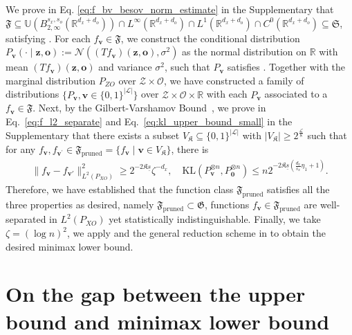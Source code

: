 \documentclass[11pt]{article}
\newcommand{\bz}{\mathbf z}
\newcommand{\bv}{\mathbf v}
\newcommand{\bo}{\mathbf o}
\newcommand{\calZ}{\mathcal{Z}}
\newcommand{\calN}{\mathcal{N}}
\newcommand{\calO}{\mathcal{O}}
\newcommand{\calL}{\mathcal{L}}
\newcommand{\R}{\mathbb{R}}
\newcommand{\0}{\mathbf{0}}
\begin{document}
We prove in Eq. \eqref{eq:f_bv_besov_norm_estimate} in the Supplementary that $\mathfrak{F}\subseteq \mathbb{U}(B^{s_x,s_o}_{2,\infty}(\mathbb{R}^{d_x+d_o})) \cap L^\infty(\R^{d_x+d_o}) \cap L^1(\R^{d_x+d_o}) \cap C^0(\R^{d_x+d_o}) \subseteq \mathfrak{S}$, satisfying . 
For each $f_\bv \in \mathfrak{F}$, we construct the conditional distribution $P_\bv(\cdot\mid \bz,\bo) := \calN((Tf_\bv)(\bz,\bo), \sigma^2)$ as the normal distribution on $\mathbb{R}$ with mean $(Tf_\bv)(\bz,\bo)$ and variance $\sigma^2$, such that $P_{\bv}$ satisfies . Together with the marginal distribution $P_{ZO}$ over $\calZ\times\calO$, we have constructed a family of distributions $\{
P_\bv, \bv \in \{0,1\}^{|\calL|}\}$ over $\calZ\times\calO\times\R$ with each $P_\bv$ associated to a $f_\bv \in \mathfrak{F}$. 
Next, by the Gilbert-Varshamov Bound~\citep[Lemma 2.9]{Tsybakov}, we prove in Eq.~\eqref{eq:f_l2_separate} and Eq.~\eqref{eq:kl_upper_bound_small} in the Supplementary that there exists a subset $V_\mathfrak{K} \subseteq \{0,1\}^{|\calL|}$ with 
$|V_\mathfrak{K}|\geq 2^{\frac{\calL}{8}}$ such that for any $f_\bv, f_{\bv^\prime} \in \mathfrak{F}_{\mathrm{pruned}} = \{f_{\bv}\mid \bv\in V_\mathfrak{K}\}$, there is 
\begin{align*}
    \|f_{\bv} - f_{\bv'}\|^2_{L^2(P_{XO})} \geq 2^{-2\mathfrak{K}\underline{s}} \zeta^{-d_x}, \quad \mathrm{KL} \left(P_{\boldsymbol{v}}^{\otimes n}, P_{\boldsymbol{0}}^{\otimes n}\right) \leq n 2^{-2\mathfrak{K}\underline{s}(\frac{d_x}{s_x}\eta_1 + 1)} . 
\end{align*}
Therefore, we have established that the function class $\mathfrak{F}_{\mathrm{pruned}}$ satisfies all the three properties as desired, namely $\mathfrak{F}_{\mathrm{pruned}}\subset \mathfrak{G}$, functions $f_\bv \in \mathfrak{F}_{\mathrm{pruned}}$ are well-separated in $L^2(P_{XO})$ yet statistically indistinguishable. 
Finally, we take $\zeta = (\log n)^2$, we apply \citet[Theorem 20]{fischer2020sobolev} and the general reduction scheme in \citet[Section 2.2]{Tsybakov} to obtain the desired minimax lower bound. 
\section{On the gap between the upper bound and minimax lower bound}
\label{sec:challenge_optimal}
\end{document}

